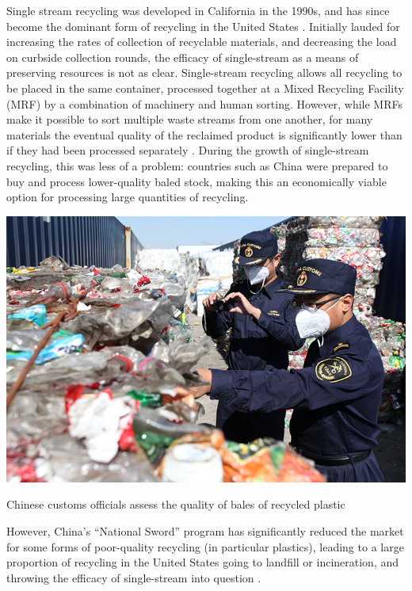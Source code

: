\documentclass[nofonts,nols,justified,nobib]{tufte-book}
\begin{document}
Single stream recycling was developed in California in the 1990s, and has since become the dominant form of recycling in the United States \cite{laskow_single-stream_2014}. Initially lauded for increasing the rates of collection of recyclable materials, and decreasing the load on curbside collection rounds, the efficacy of single-stream as a means of preserving resources is not as clear. Single-stream recycling allows all recycling to be placed in the same container, processed together at a Mixed Recycling Facility (MRF) by a combination of machinery and human sorting. However, while MRFs make it possible to sort multiple waste streams from one another, for many materials the eventual quality of the reclaimed product is significantly lower than if they had been processed separately \cite{morawski_understanding_2009}. During the growth of single-stream recycling, this was less of a problem: countries such as China were prepared to buy and process lower-quality baled stock, making this an economically viable option for processing large quantities of recycling. 
\begin{marginfigure}
\includegraphics[width=\textwidth]{img/1/china-recycling-inspection.jpg}
\caption{Chinese customs officials assess the quality of bales of recycled plastic \cite{martin_reverberations_2017}}
\end{marginfigure}
However, China's ``National Sword'' program has significantly reduced the market for some forms of poor-quality recycling (in particular plastics), leading to a large proportion of recycling in the United States going to landfill or incineration, and throwing the efficacy of single-stream into question \cite{milman_moment_2019, albeck-ripka_your_2018, martin_reverberations_2017}.
\end{document}
